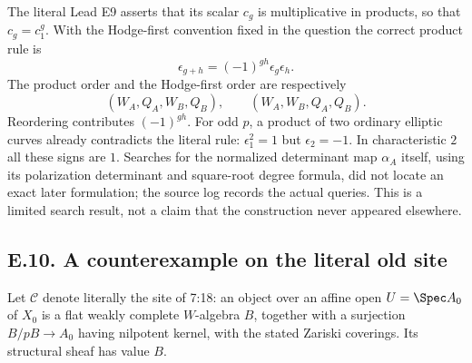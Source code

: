 The literal Lead E9 asserts that its scalar $c_g$ is multiplicative in products, so that $c_g=c_1^g$.  With the Hodge-first convention fixed in the question the correct product rule is
\[
                \epsilon_{g+h}=(-1)^{gh}\epsilon_g\epsilon_h.
\]
The product order and the Hodge-first order are respectively
\[
 (W_A,Q_A,W_B,Q_B),\qquad (W_A,W_B,Q_A,Q_B).
\]
Reordering contributes $(-1)^{gh}$. For odd $p$, a product of two ordinary elliptic curves already contradicts the literal rule: $\epsilon_1^2=1$ but $\epsilon_2=-1$. In characteristic $2$ all these signs are $1$. Searches for the normalized determinant map $\alpha_A$ itself, using its polarization determinant and square-root degree formula, did not locate an exact later formulation; the source log records the actual queries. This is a limited search result, not a claim that the construction never appeared elsewhere.

\subsection{E.10. A counterexample on the literal old site}

Let $\mathcal C$ denote literally the site of 7:18: an object over an affine open $U=\Spec A_0$ of $X_0$ is a flat weakly complete $W$-algebra $B$, together with a surjection $B/pB\to A_0$ having nilpotent kernel, with the stated Zariski coverings.  Its structural sheaf has value $B$.

